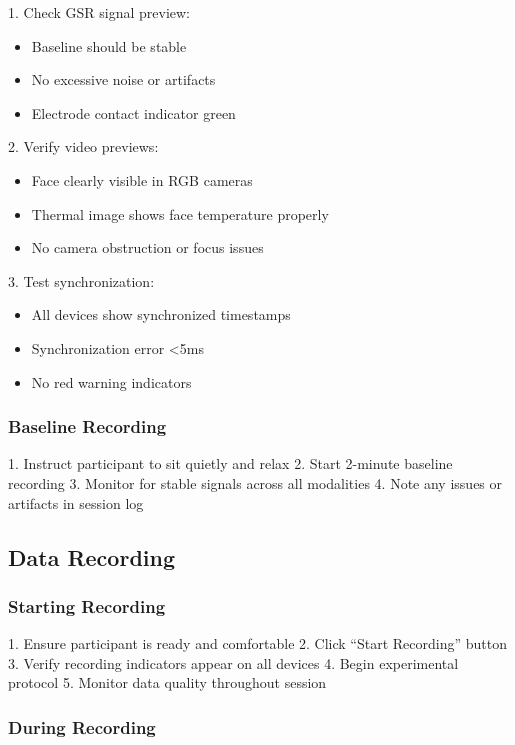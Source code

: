 1. Check GSR signal preview:
   \begin{itemize}
   \item Baseline should be stable
   \item No excessive noise or artifacts
   \item Electrode contact indicator green
   \end{itemize}

2. Verify video previews:
   \begin{itemize}
   \item Face clearly visible in RGB cameras
   \item Thermal image shows face temperature properly
   \item No camera obstruction or focus issues
   \end{itemize}

3. Test synchronization:
   \begin{itemize}
   \item All devices show synchronized timestamps
   \item Synchronization error <5ms
   \item No red warning indicators
   \end{itemize}

\subsubsection{Baseline Recording}

1. Instruct participant to sit quietly and relax
2. Start 2-minute baseline recording
3. Monitor for stable signals across all modalities
4. Note any issues or artifacts in session log

\subsection{Data Recording}

\subsubsection{Starting Recording}

1. Ensure participant is ready and comfortable
2. Click ``Start Recording'' button
3. Verify recording indicators appear on all devices
4. Begin experimental protocol
5. Monitor data quality throughout session

\subsubsection{During Recording}

